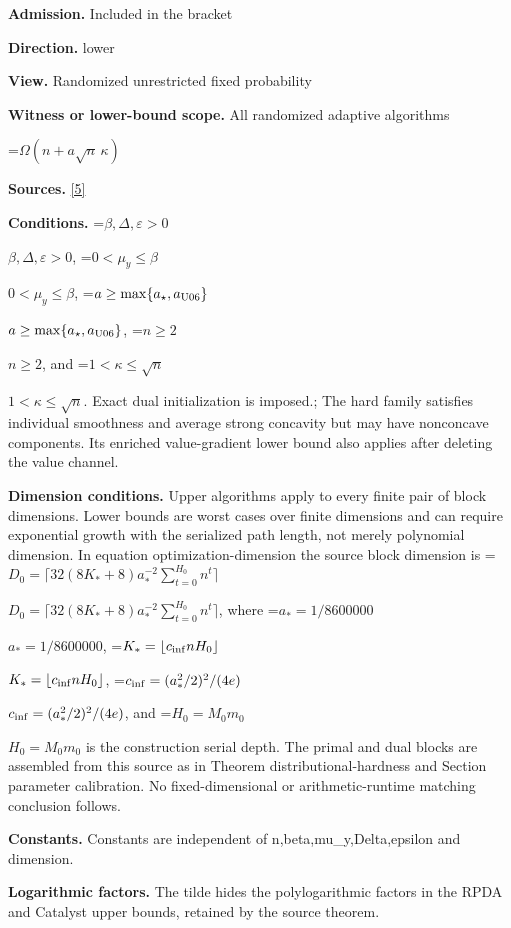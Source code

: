 \documentclass[10pt,a4paper]{article}
\newcommand{\AtlasMath}[1]{\par\begingroup\centering\setbox0=\hbox{$\displaystyle #1$}\ifdim\wd0>1.4\linewidth\typeout{ATLAS WIDE FORMULA: \the\wd0}\fi\ifdim\wd0>\linewidth\resizebox{\linewidth}{!}{\box0}\else\box0\fi\par\endgroup}
\newcommand{\AtlasInlineMath}[1]{\begingroup\setbox0=\hbox{$#1$}\ifdim\wd0>.4\linewidth\endgroup\AtlasMath{#1}\else\endgroup$#1$\fi}
\begin{document}
\textbf{Admission.} Included in the bracket



\textbf{Direction.} lower



\textbf{View.} Randomized unrestricted fixed probability



\textbf{Witness or lower-bound scope.} All randomized adaptive algorithms



\AtlasMath{\Omega(n+a\sqrt n\,\kappa)}


\textbf{Sources.} \href{https://github.com/WU-Wendao/Colombo/blob/main/colombo_sensorium/Complexity_altas/data/sources/colombo/U06/manuscript.pdf}{[5]}



\textbf{Conditions.} \AtlasInlineMath{\beta,\Delta,\varepsilon>0}, \AtlasInlineMath{0<\mu_y\le\beta}, \AtlasInlineMath{a\ge\max\{a_\star,a_{\rm U06}\}}, \AtlasInlineMath{n\ge2}, and \AtlasInlineMath{1<\kappa\le\sqrt n}. Exact dual initialization is imposed.; The hard family satisfies individual smoothness and average strong concavity but may have nonconcave components. Its enriched value-gradient lower bound also applies after deleting the value channel.



\textbf{Dimension conditions.} Upper algorithms apply to every finite pair of block dimensions. Lower bounds are worst cases over finite dimensions and can require exponential growth with the serialized path length, not merely polynomial dimension. In equation optimization-dimension the source block dimension is \AtlasInlineMath{D_0=\lceil32(8K_*+8)a_*^{-2}\sum_{t=0}^{H_0}n^t\rceil}, where \AtlasInlineMath{a_*=1/8600000}, \AtlasInlineMath{K_*=\lfloor c_{\rm inf}nH_0\rfloor}, \AtlasInlineMath{c_{\rm inf}=(a_*^2/2)^2/(4e)}, and \AtlasInlineMath{H_0=M_0m_0} is the construction serial depth. The primal and dual blocks are assembled from this source as in Theorem distributional-hardness and Section parameter calibration. No fixed-dimensional or arithmetic-runtime matching conclusion follows.



\textbf{Constants.} Constants are independent of n,beta,mu\_y,Delta,epsilon and dimension.



\textbf{Logarithmic factors.} The tilde hides the polylogarithmic factors in the RPDA and Catalyst upper bounds, retained by the source theorem.
\end{document}
